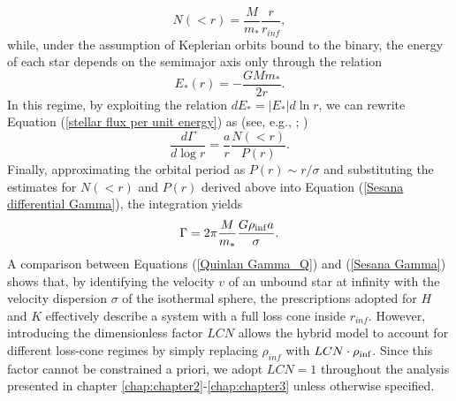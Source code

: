 \documentclass[12pt,twoside,openany]{book}
\begin{document}
\begin{equation}
 N(<r)=\frac{M}{m_*}\frac{r}{r_{inf}},
\end{equation}
while, under the assumption of Keplerian orbits bound to the binary, the energy of each star depends on the semimajor axis only through the relation
\begin{equation}
 E_*(r)=-\frac{GMm_*}{2r}.
\end{equation}
In this regime, by exploiting the relation $dE_*=|E_*|d\ln r$, we can rewrite Equation (\ref{stellar flux per unit energy}) as (see, e.g., \citealt{Perets_2007}; \citealt{Perets_2008})
\begin{equation}\label{Sesana differential Gamma}
\frac{d\Gamma}{d\log r}=\frac{a}{r}\frac{N(<r)}{P(r)}.
\end{equation}
Finally, approximating the orbital period as $P(r)\sim r/\sigma$ and substituting the estimates for $N(<r)$ and $P(r)$ derived above into Equation (\ref{Sesana differential Gamma}), the integration yields
\begin{equation}\label{Sesana Gamma}
\Gamma=2\pi \frac{M}{m_*}\frac{G\rho_{\rm inf}a}{\sigma}.
\end{equation}
A comparison between Equations (\ref{Quinlan Gamma_Q}) and (\ref{Sesana Gamma}) shows that, by identifying the velocity $v$ of an unbound star at infinity with the velocity dispersion $\sigma$ of the isothermal sphere, the prescriptions adopted for $H$ and $K$ effectively describe a system with a full loss cone inside $r_{inf}$. However, introducing the dimensionless factor $LCN$ allows the hybrid model to account for different loss-cone regimes by simply replacing $\rho_{inf}$ with $LCN\cdot\rho_{\rm inf}$. Since this factor cannot be constrained a priori, we adopt $LCN=1$ throughout the analysis presented in chapter \ref{chap:chapter2}-\ref{chap:chapter3} unless otherwise specified.
\end{document}
